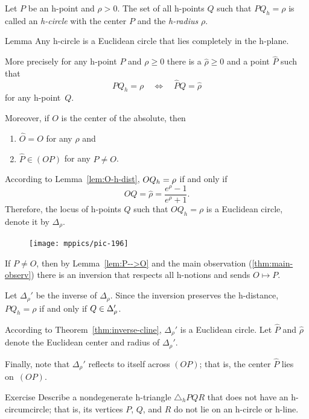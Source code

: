 Let $P$ be an h-point and $\rho>0$.
The set of all h-points $Q$ such that $PQ_h=\rho$ is called an \emph{h-circle} with the center $P$ and the \emph{h-radius} $\rho$.

\begin{thm}{Lemma}\label{lem:h-circle=circle}
Any h-circle is a Euclidean circle that lies completely in the h-plane.

More precisely for any h-point $P$ and $\rho\ge 0$
there is a $\hat\rho\ge 0$ and a point $\hat P$ such that 
$$PQ_h= \rho
\quad 
\iff
\quad
\hat PQ= \hat\rho$$
for any h-point~$Q$.

Moreover, if $O$ is the center of the absolute, then 
\begin{enumerate}
\item $\hat O=O$ for any $\rho$ and
\item $\hat P\in (OP)$ for any $P\ne O$.
\end{enumerate}

\end{thm}

According to Lemma~\ref{lem:O-h-dist}, 
$OQ_h\z= \rho$ if and only if $$OQ= \hat\rho=\frac{e^\rho-1}{e^\rho+1}.$$
Therefore, the locus of h-points $Q$ such that $OQ_h= \rho$ is a Euclidean circle, 
denote it by $\Delta_\rho$.

\begin{figure}
\vskip-3mm
\centering
\texttt{[image: mppics/pic-196]}
\end{figure}

If $P\ne O$, then by Lemma~\ref{lem:P-->O} and the main observation (\ref{thm:main-observ})
there is an inversion that respects all h-notions and sends $O\mapsto P$.

Let $\Delta_\rho'$ be the inverse of $\Delta_\rho$.
Since the inversion preserves the h-distance,
$PQ_h=\rho$ if and only if $Q\z\in\Delta_\rho'$.

According to Theorem~\ref{thm:inverse-cline}, $\Delta_\rho'$ is a Euclidean circle.
Let $\hat P$ and $\hat\rho$ denote the Euclidean center and radius of $\Delta_\rho'$.

Finally, note that $\Delta_\rho'$ reflects to itself across $(OP)$;
that is, the center $\hat P$ lies on~$(OP)$.
\qeds

\begin{thm}{Exercise}\label{ex:h-circle=circle}
Describe a nondegenerate h-triangle $\triangle_hPQR$ that does not have an h-circumcircle;
that is, its vertices $P$, $Q$, and $R$ do not lie on an h-circle or h-line.
\end{thm}

